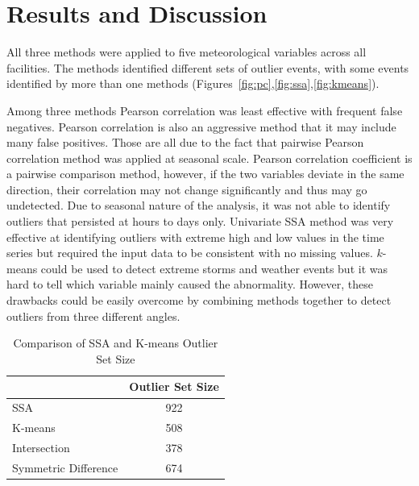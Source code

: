 \section{Results and Discussion}
All three methods were applied to five meteorological variables across
all facilities. The methods identified different sets of outlier events,
with some events identified by more than one methods
(Figures~\ref{fig:pc},\ref{fig:ssa},\ref{fig:kmeans}).

Among three methods Pearson correlation was least effective with
frequent false negatives. Pearson correlation is also an aggressive method that
it may include many false positives. Those are all due to the fact 
that pairwise Pearson correlation method was applied at seasonal scale.
Pearson correlation coefficient is a pairwise comparison method, however, 
if the two variables deviate in the same direction, their correlation 
may not change significantly and thus may go undetected. Due to seasonal
nature of the analysis, it was not able to identify outliers that
persisted at hours to days only. Univariate SSA method was very effective 
at identifying outliers with extreme high and low values in the time series 
but required the input data to be consistent with no missing values.
$k$-means could be used to detect extreme storms and weather events but it was hard
to tell which variable mainly caused the abnormality. However, these drawbacks 
could be easily overcome by combining methods together to detect 
outliers from three different angles.

\begin{table}[ht]
\caption{Comparison of SSA and K-means Outlier Set Size}
\label{tab:comp}
\centering
\begin{tabular}{|l|c|}
\cline{2-2}
\multicolumn{1}{l|}{} & Outlier Set Size\\
\hline
SSA & 922\\
K-means & 508\\
Intersection & 378\\
Symmetric Difference & 674\\
\hline
\end{tabular}
\end{table}

